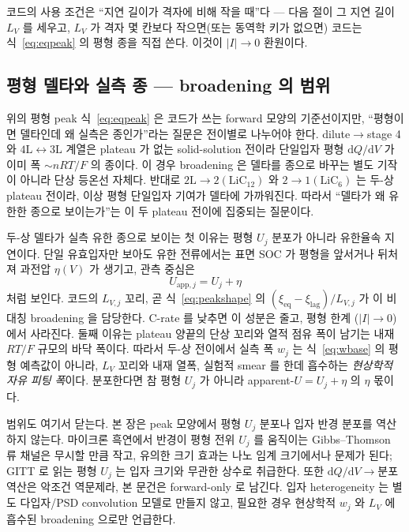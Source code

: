 \documentclass[11pt,a4paper]{article}
\newcommand{\dd}{\mathrm{d}}
\newcommand{\eq}{\mathrm{eq}}
\newcommand{\app}{\mathrm{app}}
\begin{document}
코드의 사용 조건은 ``지연 길이가 격자에 비해 작을 때''다 — 다음 절이 그 지연 길이 $L_V$ 를 세우고, $L_V$ 가 격자
몇 칸보다 작으면(또는 동역학 키가 없으면) 코드는 식~\eqref{eq:eqpeak} 의 평형 종을 직접 쓴다. 이것이 $|I|\to0$ 환원이다.

\subsection{평형 델타와 실측 종 — broadening 의 범위}\label{sec:broadening}
위의 평형 peak 식~\eqref{eq:eqpeak} 은 코드가 쓰는 forward 모양의 기준선이지만, ``평형이면 델타인데 왜 실측은 종인가''라는
질문은 전이별로 나누어야 한다. dilute$\to$stage 4 와 $4\mathrm L\leftrightarrow3\mathrm L$ 계열은 plateau 가 없는
solid-solution 전이라 단일입자 평형 $\dd Q/\dd V$ 가 이미 폭 $\sim nRT/F$ 의 종이다\cite{levi1999}. 이 경우 broadening 은
델타를 종으로 바꾸는 별도 기작이 아니라 단상 등온선 자체다. 반대로 $2\mathrm L\to2(\mathrm{LiC}_{12})$ 와
$2\to1(\mathrm{LiC}_6)$ 는 두-상 plateau 전이라, 이상 평형 단일입자 기여가 델타에 가까워진다. 따라서 ``델타가 왜 유한한
종으로 보이는가''는 이 두 plateau 전이에 집중되는 질문이다.

두-상 델타가 실측 유한 종으로 보이는 첫 이유는 평형 $U_j$ 분포가 아니라 유한율속 지연이다. 단일 유효입자만 보아도 유한
전류에서는 표면 SOC 가 평형을 앞서거나 뒤처져 과전압 $\eta(V)$ 가 생기고, 관측 중심은
\[
U_{\app,j}=U_j+\eta
\]
처럼 보인다. 코드의 $L_{V,j}$ 꼬리, 곧 식~\eqref{eq:peakshape} 의
$(\xi_\eq-\xi_\mathrm{lag})/L_{V,j}$ 가 이 비대칭 broadening 을 담당한다. C-rate 를 낮추면 이 성분은 줄고, 평형 한계
($|I|\to0$)에서 사라진다\cite{fly2020}. 둘째 이유는 plateau 양끝의 단상 꼬리와 열적 점유 폭이 남기는 내재
$RT/F$ 규모의 바닥 폭이다. 따라서 두-상 전이에서 실측 폭 $w_j$ 는 식~\eqref{eq:wbase} 의 평형 예측값이 아니라,
$L_V$ 꼬리와 내재 열폭, 실험적 smear 를 한데 흡수하는 \emph{현상학적 자유 피팅 폭}이다. 분포한다면 참 평형 $U_j$ 가 아니라
apparent-$U=U_j+\eta$ 의 $\eta$ 몫이다.

범위도 여기서 닫는다. 본 장은 peak 모양에서 평형 $U_j$ 분포나 입자 반경 분포를 역산하지 않는다. 마이크론 흑연에서
반경이 평형 전위 $U_j$ 를 움직이는 Gibbs--Thomson 류 채널은 무시할 만큼 작고, 유의한 크기 효과는 나노 임계 크기에서나
문제가 된다\cite{cogswell2012}; GITT 로 읽는 평형 $U_j$ 는 입자 크기와 무관한 상수로 취급한다\cite{park2021}. 또한
$\dd Q/\dd V\to$분포 역산은 악조건 역문제라, 본 문건은 forward-only 로 남긴다. 입자 heterogeneity 는 별도 다입자/PSD
convolution 모델로 만들지 않고, 필요한 경우 현상학적 $w_j$ 와 $L_V$ 에 흡수된 broadening 으로만 언급한다.
\end{document}
